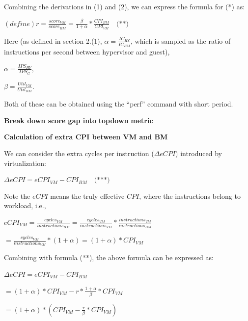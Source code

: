 \documentclass[12pt]{article}
\newcommand{\npar}[1]{#1\par}
\newcommand{\dmath}[1]{{\centering $\displaystyle #1$\par}}
\newcommand{\emptypar}{\mbox{}\par}
\newcommand{\numpara}[4]{{\hangindent=#1\relax\hangafter=1\relax
  \noindent\hspace*{\dimexpr#1-#2\relax}\makebox[#2][l]{#3}#4\par}}
\begin{document}
\npar{\hspace*{4\fontdimen2\font}Combining the derivations in (1) and (2), we can express the formula for (*) as:}
\emptypar
\dmath{\left( \mathit{define} \right)\mathit{r}=\frac{\mathit{scor}{\mathit{e}}_{\mathit{VM}}}{\mathit{scor}{\mathit{e}}_{\mathit{BM}}}=\frac{\beta }{1+\alpha }*\frac{\mathit{CP}{\mathit{I}}_{\mathit{BM}}}{{\mathit{CPI}}_{\mathit{VM}}}\quad\text{(**)}}
\npar{Here (as defined in section 2.(1), $\alpha =\frac{{\mathit{IC}}_{\mathit{HY}}}{{\mathit{IC}}_{\mathit{BM}}}$, which is sampled as the ratio of instructions per second between hypervisor and guest),}
\dmath{\alpha =\frac{\mathit{I}{\mathit{PS}}_{\mathit{HY}}}{\mathit{I}{\mathit{PS}}_{\mathit{G}}},}
\dmath{\beta =\frac{\mathit{Uti}{\mathit{l}}_{\mathit{VM}}}{\mathit{Uti}{\mathit{l}}_{\mathit{BM}}}.}
\emptypar
\npar{\hspace*{4\fontdimen2\font}Both of these can be obtained using the “perf” command with short period.}
\emptypar
\numpara{18.00pt}{18.00pt}{\textbf{3.}}{\textbf{Break down score gap into }\textbf{topdown}\textbf{ metric}}
\emptypar
\numpara{18.00pt}{18.00pt}{\textbf{(1)}}{\textbf{Calculation of extra CPI between VM and BM}}
\npar{\hspace*{4\fontdimen2\font}We can consider the extra cycles per instruction ($\Delta \mathit{eCPI}$) introduced by virtualization:}
\dmath{\Delta \mathit{eCPI}=\mathit{eCP}{\mathit{I}}_{\mathit{VM}}-\mathit{CP}{\mathit{I}}_{\mathit{BM}}\quad\text{(***)}}
\npar{\hspace*{4\fontdimen2\font}Note the $\mathit{eCPI}$ means the truly effective $\mathit{CPI}$, where the instructions belong to workload, i.e.,}
\dmath{\mathit{eCP}{\mathit{I}}_{\mathit{VM}}=\frac{\mathit{cycle}{\mathit{s}}_{\mathit{VM}}}{\mathit{instruction}{\mathit{s}}_{\mathit{BM}}}=\frac{\mathit{cycle}{\mathit{s}}_{\mathit{VM}}}{\mathit{instruction}{\mathit{s}}_{\mathit{VM}}}*\frac{\mathit{instruction}{\mathit{s}}_{\mathit{VM}}}{\mathit{instruction}{\mathit{s}}_{\mathit{BM}}}}
\dmath{=\frac{\mathit{cycle}{\mathit{s}}_{\mathit{VM}}}{\mathit{instruction}{\mathit{s}}_{\mathit{VM}}}*\left( 1+\alpha  \right)=(1+\alpha )*\mathit{CP}{\mathit{I}}_{\mathit{VM}}}
\npar{Combining with formula (**), the above formula can be expressed as:}
\dmath{\Delta \mathit{eCPI}=\mathit{eCP}{\mathit{I}}_{\mathit{VM}}-\mathit{CP}{\mathit{I}}_{\mathit{BM}}}
\dmath{=(1+\alpha )*\mathit{CP}{\mathit{I}}_{\mathit{VM}}-\mathit{r}*\frac{1+\alpha }{\beta }*{\mathit{CPI}}_{\mathit{VM}}}
\dmath{=\left( 1+\alpha  \right)*\left( \mathit{CP}{\mathit{I}}_{\mathit{VM}}-\frac{\mathit{r}}{\beta }*{\mathit{CPI}}_{\mathit{VM}} \right)}
\end{document}
